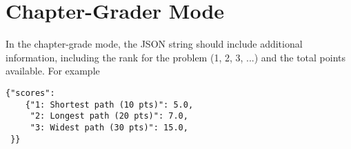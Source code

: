 \section{Chapter-Grader Mode}
\label{sec:codelabs::chapter}

\begin{gram}
\label{sec:codelabs::chapter::output}
  
In the chapter-grade mode, the JSON string should include additional information, including the rank for the problem (1, 2, 3, ...) and the total points available.  For example

\begin{lstlisting}
{"scores":
    {"1: Shortest path (10 pts)": 5.0,
     "2: Longest path (20 pts)": 7.0,
     "3: Widest path (30 pts)": 15.0,
 }}
\end{lstlisting}
\end{gram}
